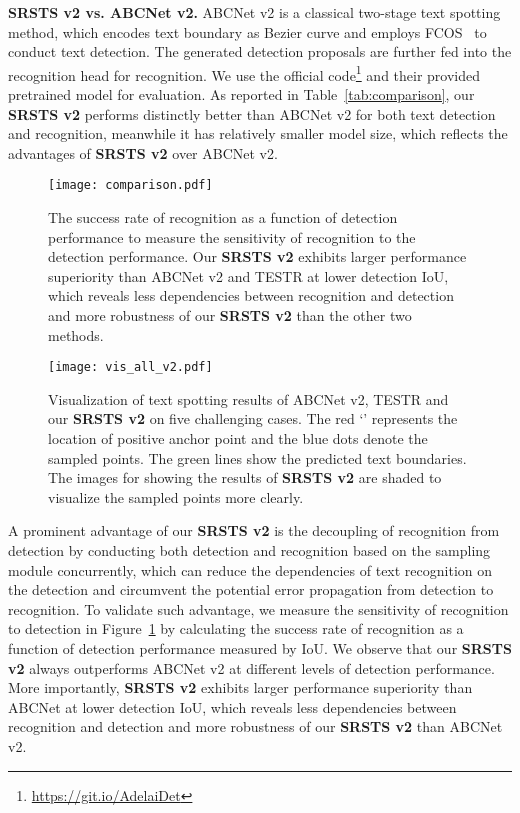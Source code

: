  

\smallskip\noindent\textbf{\textbf{SRSTS v2} vs. ABCNet v2.} ABCNet v2 is a classical two-stage text spotting method, which encodes text boundary as Bezier curve and employs FCOS~\cite{tian2019fcos} to conduct text detection. The generated detection proposals are further fed into the recognition head for recognition. We use the official code\footnote{\label{website}\url{https://git.io/AdelaiDet}} and their provided pretrained model for evaluation. As reported in Table~\ref{tab:comparison}, our \textbf{SRSTS v2} performs distinctly better than ABCNet v2 for both text detection and recognition, meanwhile it has relatively smaller model size, which reflects the advantages of \textbf{SRSTS v2} over ABCNet v2. 

\begin{figure}[!t] 
\renewcommand{\arraystretch}{1.1}
   \centering
   \centerline{\texttt{[image: comparison.pdf]}}
  \caption{The success rate of recognition as a function of detection performance to measure the sensitivity of recognition to the detection performance. Our \textbf{SRSTS v2} exhibits larger performance superiority than ABCNet v2 and TESTR at lower detection IoU, which reveals less dependencies between recognition and detection and more robustness of our \textbf{SRSTS v2} than the other two methods.}
  \label{fig:sensitivity}
\end{figure}


\begin{figure*}[!t] 
   \centering  \centerline{\texttt{[image: vis\_all\_v2.pdf]}}
  \caption{Visualization of text spotting results of ABCNet v2, TESTR and our \textbf{SRSTS v2} on five challenging cases. The \textcolor[RGB]{255,0,0}{red} ‘’ represents the location of positive anchor point and the \textcolor[RGB]{0,0,255}{blue} dots denote the sampled points. The \textcolor[RGB]{0,255,0}{green} lines show the predicted text boundaries. The images for showing the results of \textbf{SRSTS v2} are shaded to visualize the sampled points more clearly.} 
  \label{fig:vis}
\end{figure*}

A prominent advantage of our \textbf{SRSTS v2} is the decoupling of recognition from detection by conducting both detection and recognition based on the sampling module concurrently, which can reduce the dependencies of text recognition on the detection and circumvent the potential error propagation from detection to recognition. To validate such advantage, we measure the sensitivity of recognition to detection in Figure~\ref{fig:sensitivity} by calculating the success rate of recognition as a function of detection performance measured by IoU. We observe that our \textbf{SRSTS v2} always outperforms ABCNet v2 at different levels of detection performance. More importantly, \textbf{SRSTS v2} exhibits larger performance superiority than ABCNet at lower detection IoU, which reveals less dependencies between recognition and detection and more robustness of our \textbf{SRSTS v2} than ABCNet v2.




